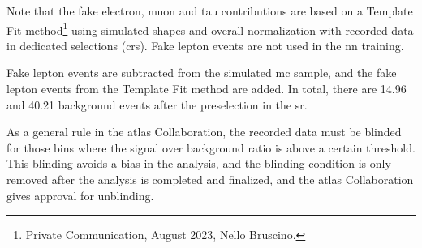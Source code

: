 \begin{table}[htb]
    \centering
    
    \label{tab:fakes_numbers}
\end{table}

Note that the fake electron, muon and tau contributions are based on a Template Fit method\footnote{Private
    Communication, August 2023, Nello Bruscino.} using simulated shapes and overall normalization with recorded data in
dedicated selections (\glspl{cr}). Fake lepton events are not used in the \gls{nn} training.

Fake lepton events are subtracted from the simulated \gls{mc} sample, and the fake lepton events from the Template Fit
method are added. In total, there are 14.96 \tth and 40.21 background events after the preselection in the \gls{sr}.

As a general rule in the \gls{atlas} Collaboration, the recorded data must be blinded for those bins where the signal
over background ratio is above a certain threshold. This blinding avoids a bias in the analysis, and the blinding
condition is only removed after the analysis is completed and finalized, and the \gls{atlas} Collaboration gives
approval for unblinding.


